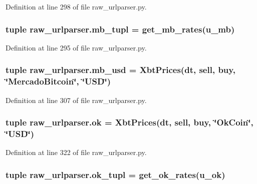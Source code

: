 Definition at line 298 of file raw\-\_\-urlparser.\-py.

\hypertarget{namespaceraw__urlparser_ac8242502920772d4c44b42f24492acd5}{
\subsubsection[{mb\-\_\-tupl}]{\setlength{\rightskip}{0pt plus 5cm}tuple raw\-\_\-urlparser.\-mb\-\_\-tupl = {\bf get\-\_\-mb\-\_\-rates}({\bf u\-\_\-mb})}}\label{namespaceraw__urlparser_ac8242502920772d4c44b42f24492acd5}


Definition at line 295 of file raw\-\_\-urlparser.\-py.

\hypertarget{namespaceraw__urlparser_a49f2920b4f7718df58d6d996a1306f32}{
\subsubsection[{mb\-\_\-usd}]{\setlength{\rightskip}{0pt plus 5cm}tuple raw\-\_\-urlparser.\-mb\-\_\-usd = {\bf Xbt\-Prices}(dt, sell, buy, \char`\"{}Mercado\-Bitcoin\char`\"{}, \char`\"{}U\-S\-D\char`\"{})}}\label{namespaceraw__urlparser_a49f2920b4f7718df58d6d996a1306f32}


Definition at line 307 of file raw\-\_\-urlparser.\-py.

\hypertarget{namespaceraw__urlparser_ac9d30be4f20423526dc111ebaba51cfe}{
\subsubsection[{ok}]{\setlength{\rightskip}{0pt plus 5cm}tuple raw\-\_\-urlparser.\-ok = {\bf Xbt\-Prices}(dt, sell, buy, \char`\"{}Ok\-Coin\char`\"{}, \char`\"{}U\-S\-D\char`\"{})}}\label{namespaceraw__urlparser_ac9d30be4f20423526dc111ebaba51cfe}


Definition at line 322 of file raw\-\_\-urlparser.\-py.

\hypertarget{namespaceraw__urlparser_a8c2d43346322c5d31fa8cb1a9cf5c121}{
\subsubsection[{ok\-\_\-tupl}]{\setlength{\rightskip}{0pt plus 5cm}tuple raw\-\_\-urlparser.\-ok\-\_\-tupl = {\bf get\-\_\-ok\-\_\-rates}({\bf u\-\_\-ok})}}\label{namespaceraw__urlparser_a8c2d43346322c5d31fa8cb1a9cf5c121}


